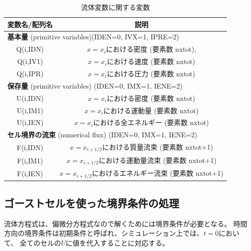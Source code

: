\begin{table}[h]
\begin{center}
\caption{流体変数に関する変数}
\begin{tabular}{|c|c|}
    \hline
    変数名/配列名 & 説明 \\
    \hline
    \hline
    \multicolumn{2}{|l|}{ {\bf 基本量} (primitive variables){\ttfamily (IDEN=0, IVX=1, IPRE=2)}} \\
    \hline
    {\ttfamily Q(i,IDN)} & $x=x_i$における密度 (要素数 {\ttfamily nxtot}),   \\
    \hline
    {\ttfamily Q(i,IV1)} & $x=x_i$における速度 (要素数 {\ttfamily nxtot}) \\
    \hline
    {\ttfamily Q(i,IPR)} & $x=x_i$における圧力 (要素数 {\ttfamily nxtot}) \\
    \hline
    \multicolumn{2}{|l|}{ {\bf 保存量} (primitive variables) {\ttfamily (IDEN=0, IMX=1, IENE=2)}} \\
    \hline
    {\ttfamily U(i,IDN)} & $x=x_i$における密度 (要素数 {\ttfamily nxtot}) \\
    \hline
    {\ttfamily U(i,IM1)} & $x=x_i$における運動量 (要素数 {\ttfamily nxtot}) \\
    \hline
    {\ttfamily U(i,IEN)} & $x=x_i$における全エネルギー (要素数 {\ttfamily nxtot}) \\
    \hline
    \multicolumn{2}{|l|}{ {\bf セル境界の流束} (numerical flux) {\ttfamily (IDEN=0, IMX=1, IENE=2)}} \\
    \hline
    {\ttfamily F(i,IDN)} & $x=x_{i+1/2}$における質量流束 (要素数 {\ttfamily nxtot+1}) \\
    \hline
    {\ttfamily F(i,IM1)} & $x=x_{i+1/2}$における運動量流束 (要素数 {\ttfamily nxtot+1}) \\
    \hline
    {\ttfamily F(i,IEN)} & $x=x_{i+1/2}$におけるエネルギー流束 (要素数 {\ttfamily nxtot+1}) \\
    \hline
\end{tabular}
\end{center}
\label{tab:phys}
\end{table}



\subsection{ゴーストセルを使った境界条件の処理}

流体方程式は、偏微分方程式なので解くためには境界条件が必要となる。
時間方向の境界条件は初期条件と呼ばれ、シミュレーション上では、$t=0$において、
全てのセルの$U$に値を代入することに対応する。

